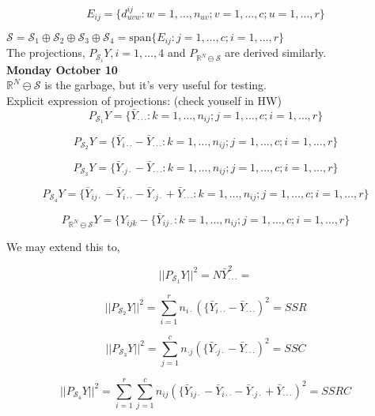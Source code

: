 \documentclass[11pt,fleqn]{book} %
\begin{document}
		$$E_{ij} = \{d^{ij}_{uvw}: w = 1, \dots, n_{uv}; v = 1, \dots, c; u = 1, \dots, r \} $$

$\mathcal{S} = \mathcal{S}_1 \oplus \mathcal{S}_2 \oplus \mathcal{S}_3 \oplus \mathcal{S}_4 = \text{span}\{E_{ij}:j = 1, \dots, c; i = 1, \dots, r\} $ \\


The projections, $P_{\mathcal{S}_i} Y, i = 1, \dots, 4$ and $P_{\mathbb{R}^N \ominus \mathcal{S}}$ are derived similarly. \\





\textbf{Monday October 10}\\

$\mathbb{R}^N \ominus \mathcal{S}$ is the garbage, but it's very useful for testing. \\


Explicit expression of projections: (check youself in HW)\\

		$$P_{\mathcal{S}_1} Y = \{\bar{Y}_{\cdot \cdot \cdot}:k = 1, \dots, n_{ij}; j = 1, \dots, c; i = 1, \dots, r \} $$

		$$P_{\mathcal{S}_2} Y = \{\bar{Y}_{i \cdot \cdot} - \bar{Y}_{\cdot \cdot \cdot} :k = 1, \dots, n_{ij}; j = 1, \dots, c; i = 1, \dots, r \} $$

		$$P_{\mathcal{S}_3} Y = \{\bar{Y}_{\cdot j \cdot} - \bar{Y}_{\cdot \cdot \cdot} :k = 1, \dots, n_{ij}; j = 1, \dots, c; i = 1, \dots, r \}$$ 

		$$P_{\mathcal{S}_4} Y = \{\bar{Y}_{ij \cdot}  - \bar{Y}_{i \cdot \cdot} - \bar{Y}_{\cdot j \cdot} + \bar{Y}_{\cdot \cdot \cdot} :k = 1, \dots, n_{ij}; j = 1, \dots, c; i = 1, \dots, r \}$$


		$$ P_{\mathbb{R}^N \ominus\mathcal{S}} Y = \{Y_{ij k} - \{\bar{Y}_{ij \cdot}:k = 1, \dots, n_{ij}; j = 1, \dots, c; i = 1, \dots, r \}$$


We may extend this to, 


		$$||P_{\mathcal{S}_1} Y||^2 = N  \bar{Y}_{\cdot \cdot \cdot}^2 = $$

		$$||P_{\mathcal{S}_2} Y||^2 = \sum^r_{i=1} n_{i\cdot}  (\{\bar{Y}_{i \cdot \cdot} - \bar{Y}_{\cdot \cdot \cdot})^2 = SSR$$

		$$||P_{\mathcal{S}_3} Y||^2 = \sum^c_{j=1} n_{\cdot j}  (\{\bar{Y}_{ \cdot j \cdot} - \bar{Y}_{\cdot \cdot \cdot})^2 = SSC$$

		$$||P_{\mathcal{S}_4} Y||^2 = \sum^r_{i=1}\sum^c_{j=1} n_{ij}  (\{\bar{Y}_{ij \cdot}  - \bar{Y}_{i \cdot \cdot} - \bar{Y}_{\cdot j \cdot} + \bar{Y}_{\cdot \cdot \cdot})^2 = SSRC$$
\end{document}
